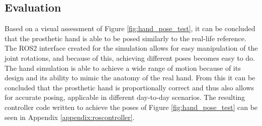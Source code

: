 \documentclass[../main.tex]{subfiles}
\begin{document}
\subsection{Evaluation}

Based on a visual assessment of Figure \ref{fig:hand_pose_test}, it can be concluded that the prosthetic hand is able to be posed similarly to the real-life reference.
The ROS2 interface created for the simulation allows for easy manipulation of the joint rotations, and because of this, achieving different poses becomes easy to do.
The hand simulation is able to achieve a wide range of motion because of its design and its ability to mimic the anatomy of the real hand.
From this it can be concluded that the prosthetic hand is proportionally correct and thus also allows for accurate posing, applicable in different day-to-day scenarios.
The resulting controller code written to achieve the poses of Figure \ref{fig:hand_pose_test} can be seen in Appendix \ref{appendix:roscontroller}.


%






\end{document}

